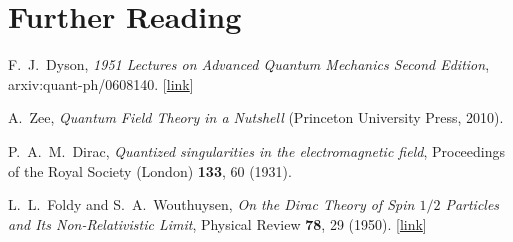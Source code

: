 \documentclass[prx,12pt]{revtex4-2}
\begin{document}
\section*{Further Reading}

\begin{enumerate}[[1{]}]
\item F.~J.~Dyson, \textit{1951 Lectures on Advanced Quantum Mechanics
  Second Edition}, arxiv:quant-ph/0608140. [\href{https://arxiv.org/abs/quant-ph/0608140}{link}]
\label{cite:dyson}

\item A.~Zee, \textit{Quantum Field Theory in a Nutshell} (Princeton
  University Press, 2010).
\label{cite:zee}

\item P.~A.~M.~Dirac, \textit{Quantized singularities in the electromagnetic field}, Proceedings of the Royal Society (London) \textbf{133}, 60 (1931).
  \label{cite:monopole}

\item L.~L.~Foldy and S.~A.~Wouthuysen, \textit{On the Dirac Theory of
  Spin $1/2$ Particles and Its Non-Relativistic Limit}, Physical
  Review \textbf{78}, 29 (1950). [\href{https://journals.aps.org/pr/abstract/10.1103/PhysRev.78.29}{link}]
\label{cite:foldy}
\end{enumerate}
\end{document}
